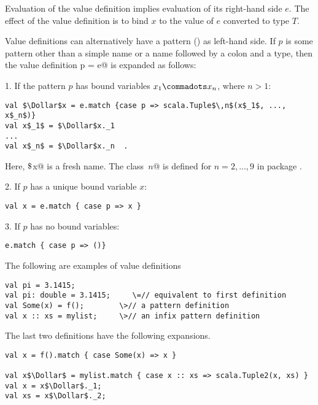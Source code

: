 \documentclass[11pt]{report}
\begin{document}
Evaluation of the value definition implies evaluation of its
right-hand side $e$.  The effect of the value definition is to bind
$x$ to the value of $e$ converted to type $T$.

Value definitions can alternatively have a pattern
() as left-hand side.  If $p$ is some pattern other
than a simple name or a name followed by a colon and a type, then the
value definition \verb@val p = e@ is expanded as follows:

1. If the pattern $p$ has bound variables $x_1 \commadots x_n$, where $n > 1$:
\begin{verbatim}
val $\Dollar$x = e.match {case p => scala.Tuple$\,n$(x$_1$, ..., x$_n$)}
val x$_1$ = $\Dollar$x._1
...
val x$_n$ = $\Dollar$x._n  .
\end{verbatim}
Here, \verb@$\Dollar$x@ is a fresh name.  The class
\verb@Tuple$\,n$@ is defined for $n = 2,...,9$ in package
\verb@scala@.

2. If $p$ has a unique bound variable $x$:
\begin{verbatim}
val x = e.match { case p => x }
\end{verbatim}

3. If $p$ has no bound variables:
\begin{verbatim}
e.match { case p => ()}
\end{verbatim}

\example
The following are examples of value definitions
\begin{verbatim}
val pi = 3.1415;
val pi: double = 3.1415;     \=// equivalent to first definition
val Some(x) = f();        \>// a pattern definition
val x :: xs = mylist;     \>// an infix pattern definition
\end{verbatim}

The last two definitions have the following expansions.
\begin{verbatim}
val x = f().match { case Some(x) => x }

val x$\Dollar$ = mylist.match { case x :: xs => scala.Tuple2(x, xs) }
val x = x$\Dollar$._1;
val xs = x$\Dollar$._2;

\end{verbatim}
\end{document}
